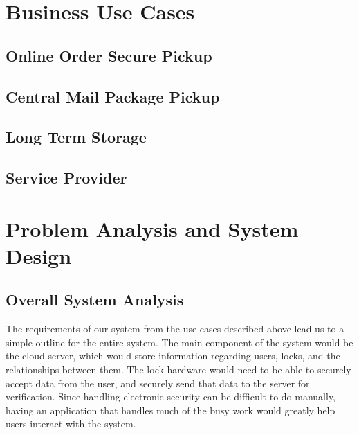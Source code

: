 \documentclass[12pt]{report}
\begin{document}

\chapter{Business Use Cases}


\section{Online Order Secure Pickup}


\section{Central Mail Package Pickup}


\section{Long Term Storage}


\section{Service Provider}


\chapter{Problem Analysis and System Design}


\section{Overall System Analysis}

The requirements of our system from the use cases described above lead us to a simple outline for the entire system.
The main component of the system would be the cloud server, which would store information regarding users, locks, and
the relationships between them. The lock hardware would need to be able to securely accept data from the user, and
securely send that data to the server for verification. Since handling electronic security can be difficult to do
manually, having an application that handles much of the busy work would greatly help users interact with the system.
\end{document}
